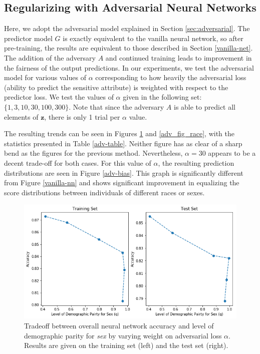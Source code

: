 \documentclass{article}
\newcommand{\bd}[1]{\boldsymbol{#1}}
\begin{document}
\subsection{Regularizing with Adversarial Neural Networks}
Here, we adopt the adversarial model explained in Section \ref{sec:adversarial}. The predictor model $G$ is exactly equivalent to the vanilla neural network, so after pre-training, the results are equivalent to those described in Section \ref{vanilla-net}. The addition of the adversary $A$ and continued training leads to improvement in the fairness of the output predictions. In our experiments, we test the adversarial model for various values of $\alpha$ corresponding to how heavily the adversarial loss (ability to predict the sensitive attribute) is weighted with respect to the predictor loss. We test the values of $\alpha$ given in the following set: $\{1, 3, 10, 30, 100, 300 \}$. Note that since the adversary $A$ is able to predict all elements of $\bd z$, there is only 1 trial per $\alpha$ value. 

The resulting trends can be seen in Figures \ref{adv_fig_sex} and \ref{adv_fig_race}, with the statistics presented in Table \ref{adv-table}. Neither figure has as clear of a sharp bend as the figures for the previous method. Nevertheless, $\alpha=30$ appears to be a decent trade-off for both cases. For this value of $\alpha$, the resulting prediction distributions are seen in Figure \ref{adv-bias}. This graph is significantly different from Figure \ref{vanilla-nn} and shows significant improvement in equalizing the score distributions between individuals of different races or sexes. 

\begin{figure}[ht]
	\vskip 0.2in
	\begin{center}
		\centerline{\includegraphics[width=\columnwidth]{img/adv_levels_sex.png}}
		\caption{Tradeoff between overall neural network accuracy and level of demographic parity for \emph{sex} by varying weight on adversarial loss $\alpha$. Results are given on the training set (left) and the test set (right).}
		\label{adv_fig_sex}
	\end{center}
	\vskip -0.2in
\end{figure}
\end{document}
